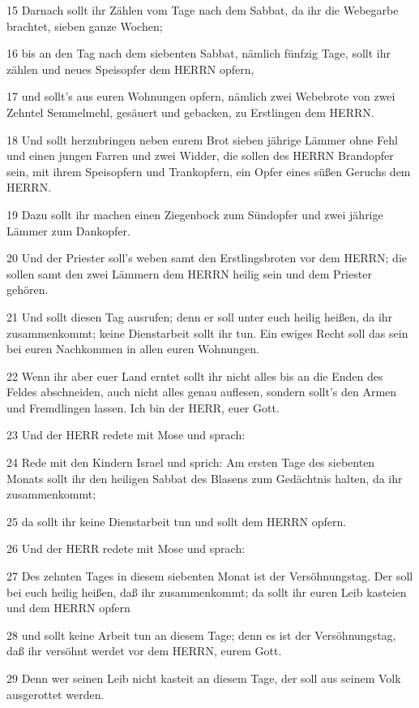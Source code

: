 \par 15 Darnach sollt ihr Zählen vom Tage nach dem Sabbat, da ihr die Webegarbe brachtet, sieben ganze Wochen;
\par 16 bis an den Tag nach dem siebenten Sabbat, nämlich fünfzig Tage, sollt ihr zählen und neues Speisopfer dem HERRN opfern,
\par 17 und sollt's aus euren Wohnungen opfern, nämlich zwei Webebrote von zwei Zehntel Semmelmehl, gesäuert und gebacken, zu Erstlingen dem HERRN.
\par 18 Und sollt herzubringen neben eurem Brot sieben jährige Lämmer ohne Fehl und einen jungen Farren und zwei Widder, die sollen des HERRN Brandopfer sein, mit ihrem Speisopfern und Trankopfern, ein Opfer eines süßen Geruchs dem HERRN.
\par 19 Dazu sollt ihr machen einen Ziegenbock zum Sündopfer und zwei jährige Lämmer zum Dankopfer.
\par 20 Und der Priester soll's weben samt den Erstlingsbroten vor dem HERRN; die sollen samt den zwei Lämmern dem HERRN heilig sein und dem Priester gehören.
\par 21 Und sollt diesen Tag ausrufen; denn er soll unter euch heilig heißen, da ihr zusammenkommt; keine Dienstarbeit sollt ihr tun. Ein ewiges Recht soll das sein bei euren Nachkommen in allen euren Wohnungen.
\par 22 Wenn ihr aber euer Land erntet sollt ihr nicht alles bis an die Enden des Feldes abschneiden, auch nicht alles genau auflesen, sondern sollt's den Armen und Fremdlingen lassen. Ich bin der HERR, euer Gott.
\par 23 Und der HERR redete mit Mose und sprach:
\par 24 Rede mit den Kindern Israel und sprich: Am ersten Tage des siebenten Monats sollt ihr den heiligen Sabbat des Blasens zum Gedächtnis halten, da ihr zusammenkommt;
\par 25 da sollt ihr keine Dienstarbeit tun und sollt dem HERRN opfern.
\par 26 Und der HERR redete mit Mose und sprach:
\par 27 Des zehnten Tages in diesem siebenten Monat ist der Versöhnungstag. Der soll bei euch heilig heißen, daß ihr zusammenkommt; da sollt ihr euren Leib kasteien und dem HERRN opfern
\par 28 und sollt keine Arbeit tun an diesem Tage; denn es ist der Versöhnungstag, daß ihr versöhnt werdet vor dem HERRN, eurem Gott.
\par 29 Denn wer seinen Leib nicht kasteit an diesem Tage, der soll aus seinem Volk ausgerottet werden.
